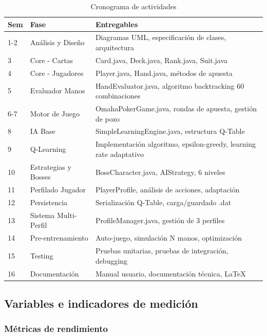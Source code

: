 \documentclass[12pt,a4paper]{article}
\begin{document}
\begin{table}[H]
\centering
\caption{Cronograma de actividades}
\begin{tabular}{|p{1cm}|p{4cm}|p{8cm}|}
\hline
\textbf{Sem} & \textbf{Fase} & \textbf{Entregables} \\
\hline
1-2 & Análisis y Diseño & Diagramas UML, especificación de clases, arquitectura \\
\hline
3 & Core - Cartas & Card.java, Deck.java, Rank.java, Suit.java \\
\hline
4 & Core - Jugadores & Player.java, Hand.java, métodos de apuesta \\
\hline
5 & Evaluador Manos & HandEvaluator.java, algoritmo backtracking 60 combinaciones \\
\hline
6-7 & Motor de Juego & OmahaPokerGame.java, rondas de apuesta, gestión de pozo \\
\hline
8 & IA Base & SimpleLearningEngine.java, estructura Q-Table \\
\hline
9 & Q-Learning & Implementación algoritmo, epsilon-greedy, learning rate adaptativo \\
\hline
10 & Estrategias y Bosses & BossCharacter.java, AIStrategy, 6 niveles \\
\hline
11 & Perfilado Jugador & PlayerProfile, análisis de acciones, adaptación \\
\hline
12 & Persistencia & Serialización Q-Table, carga/guardado .dat \\
\hline
13 & Sistema Multi-Perfil & ProfileManager.java, gestión de 3 perfiles \\
\hline
14 & Pre-entrenamiento & Auto-juego, simulación N manos, optimización \\
\hline
15 & Testing & Pruebas unitarias, pruebas de integración, debugging \\
\hline
16 & Documentación & Manual usuario, documentación técnica, LaTeX \\
\hline
\end{tabular}
\label{tab:cronograma}
\end{table}

\subsection{Variables e indicadores de medición}

\subsubsection{Métricas de rendimiento}
\end{document}
